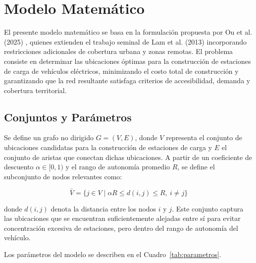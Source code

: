 \documentclass[letter, 10pt]{article}
\begin{document}
\section{Modelo Matem\'atico}

El presente modelo matemático se basa en la formulación propuesta por Ou et al. (2025) \cite{1_Solving_optimal_evcsp_problem_QUANTUM}, 
quienes extienden el trabajo seminal de Lam et al. (2013) \cite{2_EVCSP_2013-ieee-conference} incorporando restricciones 
adicionales de cobertura urbana y zonas remotas. El problema consiste en determinar las 
ubicaciones óptimas para la construcción de estaciones de carga de vehículos eléctricos, 
minimizando el costo total de construcción y garantizando que la red resultante satisfaga 
criterios de accesibilidad, demanda y cobertura territorial.

\subsection{Conjuntos y Parámetros}

Se define un grafo no dirigido $G = (V, E)$, donde $V$ representa el conjunto de ubicaciones 
candidatas para la construcción de estaciones de carga y $E$ el conjunto de aristas que conectan 
dichas ubicaciones. A partir de un coeficiente de descuento $\alpha \in [0, 1)$ y el rango de 
autonomía promedio $R$, se define el subconjunto de nodos relevantes como:

\[
\bar{V} = \{j \in V \mid \alpha R \leq d(i,j) \leq R,\ i \neq j\}
\]

donde $d(i,j)$ denota la distancia entre los nodos $i$ y $j$. Este conjunto captura las 
ubicaciones que se encuentran suficientemente alejadas entre sí para evitar concentración 
excesiva de estaciones, pero dentro del rango de autonomía del vehículo.

Los parámetros del modelo se describen en el Cuadro~\ref{tab:parametros}.
\end{document}
